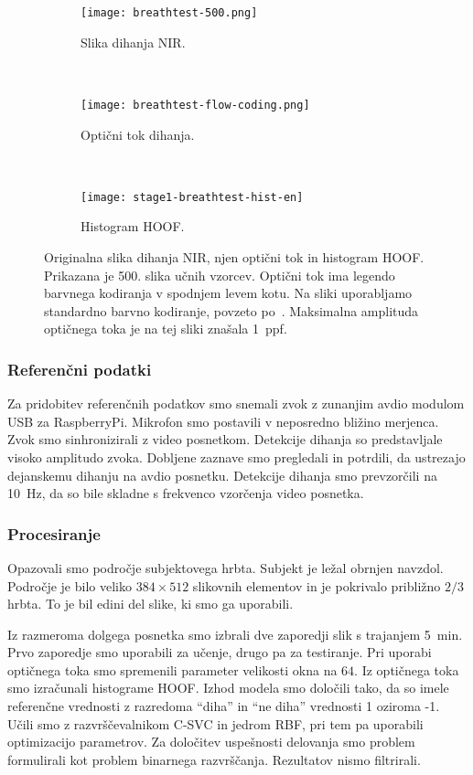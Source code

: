 \begin{figure}[htb]
	\centering
	\begin{subfigure}[t]{0.3\columnwidth}
		\centering
		\texttt{[image: breathtest-500.png]}
		\caption{Slika dihanja NIR.}
		\label{fig:dihanje-orig}
	\end{subfigure}
	~
	\begin{subfigure}[t]{0.3\columnwidth}
		\centering
		\texttt{[image: breathtest-flow-coding.png]}
		\caption{Optični tok dihanja.}
		\label{fig:dihanje-of}
	\end{subfigure}
	~
	\begin{subfigure}[t]{0.3\columnwidth}
		\centering
		\texttt{[image: stage1-breathtest-hist-en]}
		\caption{Histogram HOOF.}
		\label{fig:dihanje-hist}
	\end{subfigure}
	\caption[Originalna slika dihanja NIR, njen optični tok in histogram HOOF]{Originalna slika dihanja NIR, njen optični tok in histogram HOOF. Prikazana je 500. slika učnih vzorcev. Optični tok ima legendo barvnega kodiranja v spodnjem levem kotu. Na sliki uporabljamo standardno barvno kodiranje, povzeto po~\cite{baker2011database}. Maksimalna amplituda optičnega toka je na tej sliki znašala \SI{1}{ppf}.}
	\label{fig:dihanje}
\end{figure} 

\subsubsection{Referenčni podatki}
Za pridobitev referenčnih podatkov smo snemali zvok z zunanjim avdio modulom USB za RaspberryPi. Mikrofon smo postavili v neposredno bližino merjenca. Zvok smo sinhronizirali z video posnetkom. Detekcije dihanja so predstavljale visoko amplitudo zvoka. Dobljene zaznave smo pregledali in potrdili, da ustrezajo dejanskemu dihanju na avdio posnetku. Detekcije dihanja smo prevzorčili na \SI{10}{Hz}, da so bile skladne s frekvenco vzorčenja video posnetka.

\subsubsection{Procesiranje}\label{sec:data-preprocessing}
Opazovali smo področje subjektovega hrbta. Subjekt je ležal obrnjen navzdol. Področje je bilo veliko $384 \times 512$ slikovnih elementov in je pokrivalo približno $2/3$ hrbta. To je bil edini del slike, ki smo ga uporabili.

Iz razmeroma dolgega posnetka smo izbrali dve zaporedji slik s trajanjem \SI{5}{min}. Prvo zaporedje smo uporabili za učenje, drugo pa za testiranje. Pri uporabi optičnega toka smo spremenili parameter velikosti okna na $64$. Iz optičnega toka smo izračunali histograme HOOF. Izhod modela smo določili tako, da so imele referenčne vrednosti z razredoma ``diha'' in ``ne diha'' vrednosti 1 oziroma -1. Učili smo z razvrščevalnikom C-SVC in jedrom RBF, pri tem pa uporabili optimizacijo parametrov. Za določitev uspešnosti delovanja smo problem formulirali kot problem binarnega razvrščanja. Rezultatov nismo filtrirali.


